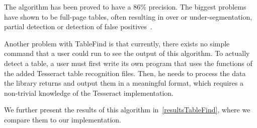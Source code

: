 The algorithm has been proved to have a 86\% precision. The biggest problems have shown to be full-page tables, often resulting in over or under-segmentation, partial detection or detection of false positives~\citep{tableDetHeterogeneous}.

Another problem with TableFind is that currently, there exists no simple command that a user could run to see the output of this algorithm. To actually detect a table, a user must first write its own program that uses the functions of the added Tesseract table recognition files. Then, he needs to process the data the library returns and output them in a meaningful format, which requires a non-trivial knowledge of the Tesseract implementation.

We further present the results of this algorithm in~\cref{resultsTableFind}, where we compare them to our implementation.
   
